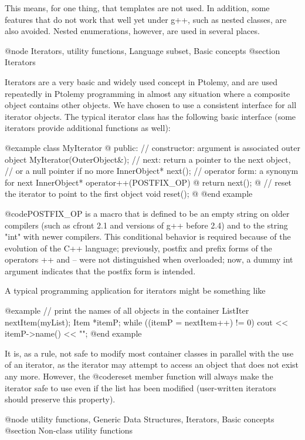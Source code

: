This means, for one thing, that templates are not used.  In addition,
some features that do not work that well yet under g++, such as
nested classes, are also avoided.  Nested enumerations, however,
are used in several places.

@node Iterators, utility functions, Language subset, Basic concepts
@section Iterators

Iterators are a very basic and widely used concept in Ptolemy, and are
used repeatedly in Ptolemy programming in almost any situation where a
composite object contains other objects.  We have chosen to use a
consistent interface for all iterator objects.  The typical iterator
class has the following basic interface (some iterators provide additional
functions as well):

@example
class MyIterator @{
public:
    // constructor: argument is associated outer object
    MyIterator(OuterObject&);
    // next: return a pointer to the next object,
    // or a null pointer if no more
    InnerObject* next();
    // operator form: a synonym for next
    InnerObject* operator++(POSTFIX_OP) @{ return next(); @}
    // reset the iterator to point to the first object
    void reset();
@}
@end example

@code{POSTFIX_OP} is a macro that is defined to be an empty string on
older compilers (such as cfront 2.1 and versions of g++ before 2.4) and
to the string "int" with newer compilers.  This conditional behavior is
required because of the evolution of the C++ language; previously,
postfix and prefix forms of the operators ++ and -- were not
distinguished when overloaded; now, a dummy int argument indicates that
the postfix form is intended.

A typical programming application for iterators might be something like

@example
// print the names of all objects in the container
ListIter nextItem(myList);
Item *itemP;
while ((itemP = nextItem++) != 0)
    cout << itemP->name() << "\n";
@end example

It is, as a rule, not safe to modify most container classes in parallel
with the use of an iterator, as the iterator may attempt to access an
object that does not exist any more.  However, the @code{reset} member
function will always make the iterator safe to use even if the list has
been modified (user-written iterators should preserve this property).

@node utility functions, Generic Data Structures, Iterators, Basic concepts
@section Non-class utility functions

